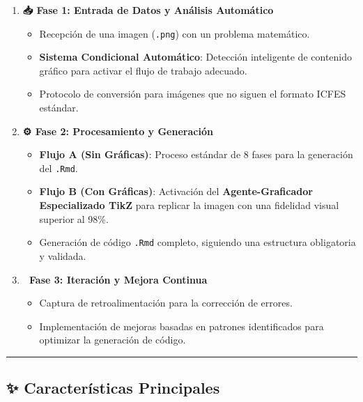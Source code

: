 \documentclass[
]{article}
\providecommand{\tightlist}{%
  \setlength{\itemsep}{0pt}\setlength{\parskip}{0pt}}
\begin{document}
\begin{enumerate}
\def\labelenumi{\arabic{enumi}.}
\tightlist
\item
  \textbf{📥 Fase 1: Entrada de Datos y Análisis Automático}

  \begin{itemize}
  \tightlist
  \item
    Recepción de una imagen (\texttt{.png}) con un problema matemático.
  \item
    \textbf{Sistema Condicional Automático}: Detección inteligente de
    contenido gráfico para activar el flujo de trabajo adecuado.
  \item
    Protocolo de conversión para imágenes que no siguen el formato ICFES
    estándar.
  \end{itemize}
\item
  \textbf{⚙️ Fase 2: Procesamiento y Generación}

  \begin{itemize}
  \tightlist
  \item
    \textbf{Flujo A (Sin Gráficas)}: Proceso estándar de 8 fases para la
    generación del \texttt{.Rmd}.
  \item
    \textbf{Flujo B (Con Gráficas)}: Activación del
    \textbf{Agente-Graficador Especializado TikZ} para replicar la
    imagen con una fidelidad visual superior al 98\%.
  \item
    Generación de código \texttt{.Rmd} completo, siguiendo una
    estructura obligatoria y validada.
  \end{itemize}
\item
  \textbf{🔄 Fase 3: Iteración y Mejora Continua}

  \begin{itemize}
  \tightlist
  \item
    Captura de retroalimentación para la corrección de errores.
  \item
    Implementación de mejoras basadas en patrones identificados para
    optimizar la generación de código.
  \end{itemize}
\end{enumerate}

\begin{center}\rule{0.5\linewidth}{0.5pt}\end{center}

\subsection{\texorpdfstring{✨ \textbf{Características
Principales}}{✨ Características Principales}}\label{caracteruxedsticas-principales}
\end{document}
